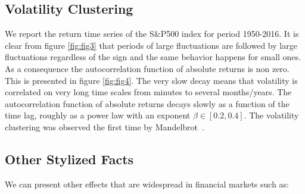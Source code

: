 \documentclass[letterpaper,12pt]{article}
\begin{document}
\subsection{Volatility Clustering}

We report the return time series of the S\&P500 index for period 1950-2016. It is clear from figure \ref{fig:fig3} that periods of large fluctuations are followed by large fluctuations regardless of the sign and the same behavior happens for small ones. As a consequence the autocorrelation function of absolute returns is non zero. This is presented in figure \ref{fig:fig4}. The very slow decay means that volatility is correlated on very long time scales from minutes to several months/years. The autocorrelation function of absolute returns decays slowly as a function of the time lag, roughly as a power law with an exponent $\beta \in [0.2, 0.4]$. The volatility clustering was observed the first time by Mandelbrot~\cite{Mandelbrot}.

\subsection{Other Stylized Facts}

We can present other effects that are widespread in financial markets such as:
\end{document}
